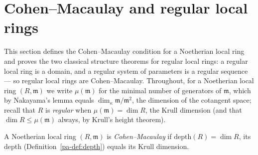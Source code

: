 \section{Cohen--Macaulay and regular local rings}
\label{pa-sec:regular_cm}

This section defines the Cohen--Macaulay condition for a Noetherian local ring and
proves the two classical structure theorems for regular local rings: a regular local
ring is a domain, and a regular system of parameters is a regular sequence --- so
regular local rings are Cohen--Macaulay. Throughout, for a Noetherian local ring
\((R, \mathfrak m)\) we write \(\mu(\mathfrak m)\) for the minimal number of generators
of \(\mathfrak m\), which by Nakayama's lemma equals
\(\dim_\kappa \mathfrak m/\mathfrak m^2\), the dimension of the cotangent space; recall
that \(R\) is \emph{regular} when \(\mu(\mathfrak m) = \dim R\), the Krull dimension
(and that \(\dim R \leq \mu(\mathfrak m)\) always, by Krull's height theorem).

\begin{definition}
  \label{pa-def:cohen_macaulay}
  \leanok

  A Noetherian local ring \((R, \mathfrak m)\) is \emph{Cohen--Macaulay} if
  \(\mathrm{depth}(R) = \dim R\), its depth (Definition~\ref{pa-def:depth}) equals its
  Krull dimension.
\end{definition}

